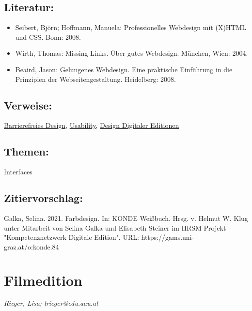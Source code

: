 \documentclass{article}
\begin{document}
        \subsection*{Literatur:}\begin{itemize}\item Seibert, Björn; Hoffmann, Manuela: Professionelles Webdesign mit (X)HTML und CSS. Bonn: 2008.\item Wirth, Thomas: Missing Links. Über gutes Webdesign. München, Wien: 2004.\item Beaird, Jason: Gelungenes Webdesign. Eine praktische Einführung in die Prinzipien der Webseitengestaltung. Heidelberg: 2008.\end{itemize}\subsection*{Verweise:}\href{https://gams.uni-graz.at/o:konde.35}{Barrierefreies Design}, \href{https://gams.uni-graz.at/o:konde.205}{Usability}, \href{https://gams.uni-graz.at/o:konde.56}{Design Digitaler Editionen}\subsection*{Themen:}Interfaces\subsection*{Zitiervorschlag:}Galka, Selina. 2021. Farbdesign. In: KONDE Weißbuch. Hrsg. v. Helmut W. Klug unter Mitarbeit von Selina Galka und Elisabeth Steiner im HRSM Projekt "Kompetenznetzwerk Digitale Edition". URL: https://gams.uni-graz.at/o:konde.84\newpage\section*{Filmedition} \emph{Rieger, Lisa; lrieger@edu.aau.at }\\
        
\end{document}
